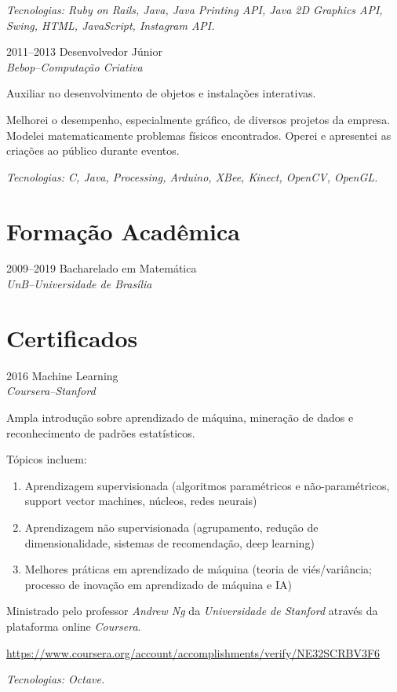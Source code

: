 \documentclass[a4paper]{simplecv}
\begin{document}
\begin{topic}
	{\em\scriptsize Tecnologias: Ruby on Rails, Java, Java Printing API,
	Java 2D Graphics API, Swing, HTML, JavaScript, Instagram API.}

\item[2011--2013] Desenvolvedor Júnior\\
	{\em\small Bebop--Computação Criativa}

	Auxiliar no desenvolvimento de objetos e instalações interativas.

	Melhorei o desempenho, especialmente gráfico, de diversos projetos da
	empresa. Modelei matematicamente problemas físicos encontrados. Operei
	e apresentei as criações ao público durante eventos.

	{\em\scriptsize Tecnologias: C, Java, Processing, Arduino, XBee,
	Kinect, OpenCV, OpenGL.}
\end{topic}

\section{Formação Acadêmica}

\begin{topic}
\item[2009--2019] Bacharelado em Matemática\\
	{\em\small UnB--Universidade de Brasília}

\end{topic}

\section{Certificados}

\begin{topic}
\item[2016] Machine Learning\\
	{\em\small Coursera--Stanford}

	Ampla introdução sobre aprendizado de máquina, mineração de dados e
	reconhecimento de padrões estatísticos.

	Tópicos incluem:
	\begin{enumerate}
		\item Aprendizagem supervisionada (algoritmos paramétricos e
			não-paramétricos, support vector machines, núcleos,
			redes neurais)

		\item Aprendizagem não supervisionada (agrupamento, redução de
			dimensionalidade, sistemas de recomendação, deep
			learning)

		\item Melhores práticas em aprendizado de máquina (teoria de
			viés/variância; processo de inovação em aprendizado de
			máquina e IA)
	\end{enumerate}

	Ministrado pelo professor \emph{Andrew Ng} da \emph{Universidade de
	Stanford} através da plataforma online \emph{Coursera}.

	{\scriptsize\url{https://www.coursera.org/account/accomplishments/verify/NE32SCRBV3F6}}

	{\em\scriptsize Tecnologias: Octave.}
\end{topic}
\end{document}
